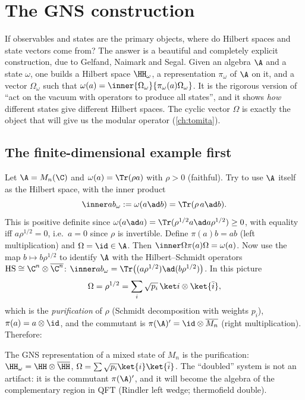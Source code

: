 \chapter{The GNS construction}\label{ch:gns}

\begin{physmotiv}
If observables and states are the primary objects, where do Hilbert spaces and state vectors come from? The answer is a beautiful and completely explicit construction, due to Gelfand, Naimark and Segal. Given an algebra $\A$ and a state $\omega$, one builds a Hilbert space $\HH_\omega$, a representation $\pi_\omega$ of $\A$ on it, and a vector $\Omega_\omega$ such that $\omega(a)=\inner{\Omega_\omega}{\pi_\omega(a)\Omega_\omega}$. It is the rigorous version of ``act on the vacuum with operators to produce all states'', and it shows \emph{how} different states give different Hilbert spaces. The cyclic vector $\Omega$ is exactly the object that will give us the modular operator (\cref{ch:tomita}).
\end{physmotiv}

\section{The finite-dimensional example first}

Let $\A=M_n(\C)$ and $\omega(a)=\Tr(\rho a)$ with $\rho>0$ (faithful). Try to use $\A$ itself as the Hilbert space, with the inner product
\begin{equation}
\inner ab_\omega:=\omega(a\ad b)=\Tr(\rho\,a\ad b).
\end{equation}
This is positive definite since $\omega(a\ad a)=\Tr(\rho^{1/2}a\ad a\rho^{1/2})\ge0$, with equality iff $a\rho^{1/2}=0$, i.e.\ $a=0$ since $\rho$ is invertible. Define $\pi(a)b=ab$ (left multiplication) and $\Omega=\id\in\A$. Then $\inner\Omega{\pi(a)\Omega}=\omega(a)$. Now use the map $b\mapsto b\rho^{1/2}$ to identify $\A$ with the Hilbert--Schmidt operators $\mathrm{HS}\cong\C^n\otimes\overline{\C^n}$: $\inner ab_\omega=\Tr\big((a\rho^{1/2})\ad(b\rho^{1/2})\big)$. In this picture
\begin{equation}
\Omega=\rho^{1/2}=\sum_i\sqrt{p_i}\,\ket i\otimes\ket{\bar i},
\end{equation}
which is the \emph{purification} of $\rho$ (Schmidt decomposition with weights $p_i$), $\pi(a)=a\otimes\id$, and the commutant is $\pi(\A)'=\id\otimes\overline{M_n}$ (right multiplication). Therefore:

\begin{keyidea}
The GNS representation of a mixed state of $M_n$ is the purification: $\HH_\omega=\HH\otimes\overline\HH$, $\Omega=\sum\sqrt{p_i}\ket{i}\ket{\bar i}$. The ``doubled'' system is not an artifact: it is the commutant $\pi(\A)'$, and it will become the algebra of the complementary region in QFT (Rindler left wedge; thermofield double).
\end{keyidea}

